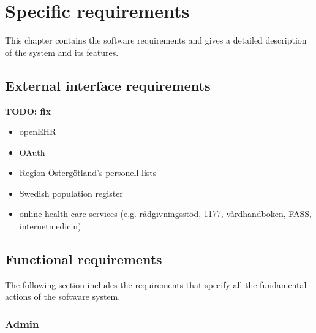 \documentclass{scrreprt}
\begin{document}
\chapter{Specific requirements}
This chapter contains the software requirements and gives a detailed
description of the system and its features. 

\section{External interface requirements}
\textbf{TODO: fix}
\begin{itemize}
    \item openEHR
    \item OAuth
    \item Region Östergötland's personell lists 
    \item Swedish population register 
    \item online health care services (e.g. rådgivningsstöd, 1177, vårdhandboken, FASS, internetmedicin) 
\end{itemize}


\section{Functional requirements}
The following section includes the requirements that specify all the fundamental actions of the software system.

\subsection{Admin}
\end{document}
